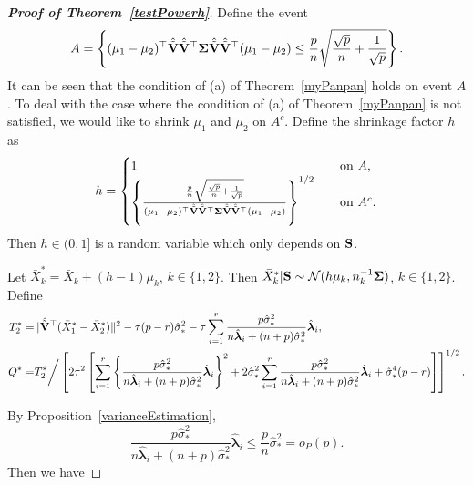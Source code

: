 \documentclass[times,sort&compress,3p]{elsarticle}
\newcommand{\bfsym}[1]{\ensuremath{\boldsymbol{#1}}}
\def\blambda {\bfsym {\lambda}}        \def\bLambda {\bfsym {\Lambda}}
\theoremstyle{plain}
\theoremstyle{definition}
\theoremstyle{remark}
\begin{document}
\begin{appendices}
\begin{proof}[\textbf{Proof of Theorem~\ref{testPowerh}}]
    Define the event
    $$
    A=\left\{
            (\mu_1-\mu_2)^\top  \hat{\tilde{\BV}}\hat{\tilde{\BV}}^\top  \bSigma \hat{\tilde{\BV}}\hat{\tilde{\BV}}^\top (\mu_1-\mu_2)\leq
            \frac{p}{n}\sqrt{\frac{\sqrt{p}}{n}+\frac{1}{\sqrt{p}}}
        \right\}.
    $$
    It can be seen that the condition of (a) of Theorem~\ref{myPanpan} holds on event $A$.
    To deal with the case where the condition of (a) of Theorem~\ref{myPanpan} is not satisfied, we would like to shrink $\mu_1$ and $\mu_2$ on $A^c$.
    Define the shrinkage factor $h$ as
$$
    h=
        \begin{cases}
            1&\quad \text{on }  A,\\
            \left\{ 
            \frac{
\frac{p}{n}\sqrt{\frac{\sqrt{p}}{n}+\frac{1}{\sqrt{p}}}
            }{(\mu_1-\mu_2)^\top  \hat{\tilde{\BV}}\hat{\tilde{\BV}}^\top  \bSigma \hat{\tilde{\BV}}\hat{\tilde{\BV}}^\top (\mu_1-\mu_2) }
        \right\}^{1/2}
            &\quad \text{on }
            A^c
            .\\
        \end{cases}
$$
    Then $h\in (0,1]$ is a random variable which only depends on $\mathbf{S}$. 


    Let $\bar{X}_{k}^*=\bar{X}_k+(h-1)\mu_k$, $k\in\{1,2\}$. Then $\bar{X}_k^*|\BS\sim \mathcal{N}(h\mu_k,n_k^{-1}\bSigma)$, $k\in\{1,2\}$.
    Define
    \begin{align*}
        T_2^*=&\|\hat{\tilde{\BV}}^\top  (\bar{X}_1^*-\bar{X}_2^*)\|^2
-
\tau(p-r)\hat{\sigma}_*^2 
- \tau\sum_{i=1}^r \frac{p\hat{\sigma}_*^2}{n\hat{\blambda}_i+(n+p)\hat{\sigma}_*^2}\hat{\blambda}_i,\\
        Q^*=&
T_2^*\bigg/
   \left[ 
        2\tau^2\left[
            \sum_{i=1}^r \left\{\frac{p\hat{\sigma}_*^2}{n\hat{\blambda}_i+(n+p)\hat{\sigma}_*^2}\hat{\blambda}_i\right\}^2
    +
        2\hat{\sigma}_*^2\sum_{i=1}^r \frac{p\hat{\sigma}_*^2}{n\hat{\blambda}_i+(n+p)\hat{\sigma}_*^2}\hat{\blambda}_i
        +\hat{\sigma}_*^4 (p-r)
\right]\right]^{1/2}.
    \end{align*}

By Proposition~\ref{varianceEstimation},
$$
\frac{p\hat{\sigma}_*^2}{n\hat{\blambda}_i+(n+p)\hat{\sigma}_*^2}\hat{\blambda}_i\leq
\frac{p}{n}\hat{\sigma}_*^2
=o_P(p).
$$
Then we have 


\end{proof}
\end{appendices}
\end{document}
